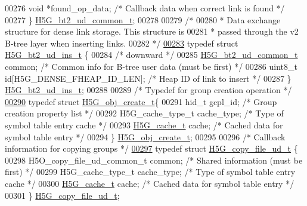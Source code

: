 \begin{DoxyCode}
00276     \textcolor{keywordtype}{void}        *found\_op\_data;         \textcolor{comment}{/* Callback data when correct link is found */}
00277 \} \hyperlink{struct_h5_g__bt2__ud__common__t}{H5G\_bt2\_ud\_common\_t};
00278 
00279 \textcolor{comment}{/*}
00280 \textcolor{comment}{ * Data exchange structure for dense link storage.  This structure is}
00281 \textcolor{comment}{ * passed through the v2 B-tree layer when inserting links.}
00282 \textcolor{comment}{ */}
\hyperlink{struct_h5_g__bt2__ud__ins__t}{00283} \textcolor{keyword}{typedef} \textcolor{keyword}{struct }\hyperlink{struct_h5_g__bt2__ud__ins__t}{H5G\_bt2\_ud\_ins\_t} \{
00284     \textcolor{comment}{/* downward */}
00285     \hyperlink{struct_h5_g__bt2__ud__common__t}{H5G\_bt2\_ud\_common\_t} common;         \textcolor{comment}{/* Common info for B-tree user data (must be
       first) */}
00286     uint8\_t \textcolor{keywordtype}{id}[H5G\_DENSE\_FHEAP\_ID\_LEN]; \textcolor{comment}{/* Heap ID of link to insert         */}
00287 \} \hyperlink{struct_h5_g__bt2__ud__ins__t}{H5G\_bt2\_ud\_ins\_t};
00288 
00289 \textcolor{comment}{/* Typedef for group creation operation */}
\hyperlink{struct_h5_g__obj__create__t}{00290} \textcolor{keyword}{typedef} \textcolor{keyword}{struct }\hyperlink{struct_h5_g__obj__create__t}{H5G\_obj\_create\_t}\{
00291     hid\_t gcpl\_id;              \textcolor{comment}{/* Group creation property list */}
00292     H5G\_cache\_type\_t cache\_type; \textcolor{comment}{/* Type of symbol table entry cache */}
00293     \hyperlink{union_h5_g__cache__t}{H5G\_cache\_t} cache;          \textcolor{comment}{/* Cached data for symbol table entry */}
00294 \} \hyperlink{struct_h5_g__obj__create__t}{H5G\_obj\_create\_t};
00295 
00296 \textcolor{comment}{/* Callback information for copying groups */}
\hyperlink{struct_h5_g__copy__file__ud__t}{00297} \textcolor{keyword}{typedef} \textcolor{keyword}{struct }\hyperlink{struct_h5_g__copy__file__ud__t}{H5G\_copy\_file\_ud\_t} \{
00298     H5O\_copy\_file\_ud\_common\_t common;   \textcolor{comment}{/* Shared information (must be first) */}
00299     H5G\_cache\_type\_t cache\_type;        \textcolor{comment}{/* Type of symbol table entry cache */}
00300     \hyperlink{union_h5_g__cache__t}{H5G\_cache\_t} cache;                  \textcolor{comment}{/* Cached data for symbol table entry */}
00301 \} \hyperlink{struct_h5_g__copy__file__ud__t}{H5G\_copy\_file\_ud\_t};

\end{DoxyCode}
